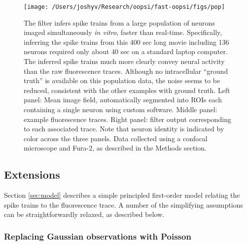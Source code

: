 \begin{figure}[h!]
\begin{centering} 
\texttt{[image: /Users/joshyv/Research/oopsi/fast-oopsi/figs/pop]}
\end{centering}
\caption[\foopsi filter is robust and works online for populations of neurons]{The \foopsi filter infers spike trains from a large population of neurons imaged simultaneously \emph{in vitro}, faster than real-time.  Specifically, inferring the spike trains from this 400 sec long movie including 136 neurons required only about 40 sec on a standard laptop computer. The inferred spike trains much more clearly convey neural activity than the raw fluorescence traces.  Although no intracellular ``ground truth'' is available on this population data, the noise seems to be reduced, consistent with the other examples with ground truth.  Left panel: Mean image field, automatically segmented into ROIs each containing a single neuron using custom software.  Middle panel: example fluorescence traces.  Right panel: \foopsi filter output corresponding to each associated trace. Note that neuron identity is indicated by color across the three panels. Data collected using a confocal microscope and Fura-2, as described in the Methods section.} \label{fig:pop}
\end{figure}


\subsection{Extensions}

Section \ref{sec:model} describes a simple principled first-order model relating the spike trains to the fluorescence trace. A number of the simplifying assumptions can be straightforwardly relaxed, as described below.


\subsubsection{Replacing Gaussian observations with Poisson}

